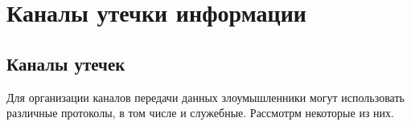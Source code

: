 \chapter{Каналы утечки информации}



\section{Каналы утечек}
Для организации каналов передачи данных злоумышленники могут использовать различные протоколы, в том числе и служебные. Рассмотрм некоторые из них.


